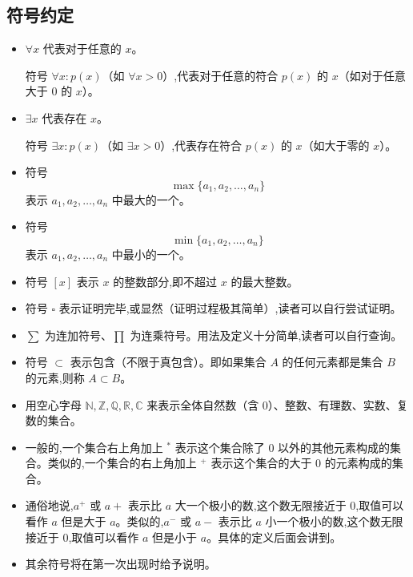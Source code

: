 \documentclass[lang=cn,10pt,twoside]{elegantbook}
\begin{document}
\subsection{符号约定}
\begin{itemize}
  \item $\forall x$ 代表对于任意的 $x$。
  
  符号 $\forall x: p(x)$（如 $\forall x>0$）,代表对于任意的符合 $p(x)$ 的 $x$（如对于任意大于 $0$ 的 $x$）。
  \item $\exists x$ 代表存在 $x$。
  
  符号 $\exists x: p(x)$（如 $\exists x > 0$）,代表存在符合 $p(x)$ 的 $x$（如大于零的 $x$）。
  \item 符号
  \begin{equation*}
    \max\{a_1, a_2, \dots, a_n\}
  \end{equation*}
  表示 $a_1, a_2, \dots, a_n$ 中最大的一个。
  \item 符号
  \begin{equation*}
    \min\{a_1, a_2, \dots, a_n\}
  \end{equation*}
  表示 $a_1, a_2, \dots, a_n$ 中最小的一个。
  \item 符号 $[x]$ 表示 $x$ 的整数部分,即不超过 $x$ 的最大整数。
  \item 符号 $\square$ 表示证明完毕,或显然（证明过程极其简单）,读者可以自行尝试证明。
  \item $\sum$ 为连加符号、$\prod$ 为连乘符号。用法及定义十分简单,读者可以自行查询。
  \item 符号 $\subset$ 表示包含（不限于真包含）。即如果集合 $A$ 的任何元素都是集合 $B$ 的元素,则称 $A \subset B$。

  \item 用空心字母 $\mathbb{N, Z, Q, R, C}$ 来表示全体自然数（含 $0$）、整数、有理数、实数、复数的集合。

  \item 一般的,一个集合右上角加上 $^*$ 表示这个集合除了 $0$ 以外的其他元素构成的集合。类似的,一个集合的右上角加上 $^+$ 表示这个集合的大于 $0$ 的元素构成的集合。

  \item 通俗地说,$a^+$ 或 $a+$ 表示比 $a$ 大一个极小的数,这个数无限接近于 $0$,取值可以看作 $a$ 但是大于 $a$。类似的,$a^-$ 或 $a-$ 表示比 $a$ 小一个极小的数,这个数无限接近于 $0$,取值可以看作 $a$ 但是小于 $a$。具体的定义后面会讲到。

  \item 其余符号将在第一次出现时给予说明。
\end{itemize}
\end{document}
